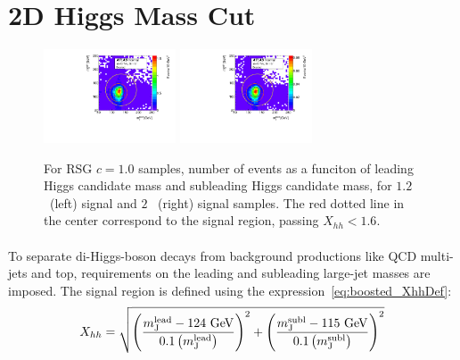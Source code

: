 
\section{2D Higgs Mass Cut}

\begin{figure}[htbp!]
\begin{center}
\includegraphics[width=0.35\textwidth,angle=-90]{figures/boosted/Truth/Sig_1200_AllTag_Incl_mH0H1.pdf}
\includegraphics[width=0.35\textwidth,angle=-90]{figures/boosted/Truth/Sig_2000_AllTag_Incl_mH0H1.pdf}
\caption{For RSG $c=1.0$ samples, number of events as a funciton of leading Higgs candidate mass and subleading Higgs candidate mass, for $1.2$ \TeV~(left) signal and $2$ \TeV~(right) signal samples. The red dotted line in the center correspond to the signal region, passing $X_{hh} < 1.6$.}
\label{fig:evt-signal-mhh}
\end{center}
\end{figure}


\paragraph{}
To separate di-Higgs-boson decays from background productions like QCD multi-jets and top, requirements on the leading and subleading large-\R jet masses are imposed. 
The signal region is defined using the expression~\ref{eq:boosted_XhhDef}:
\begin{equation}
\label{eq:boosted_XhhDef}
X_{hh} = \sqrt{\left(\frac{m^{\rm lead}_{\rm J} - \text{124 GeV}}{0.1 \left(m^{\rm lead}_{\rm J}\right)}\right)^2 + \left(\frac{m^{\rm subl}_{\rm J}- \text{115 GeV}}{0.1 \left(m^{\rm subl}_{\rm J}\right)}\right)^2}
\end{equation}

